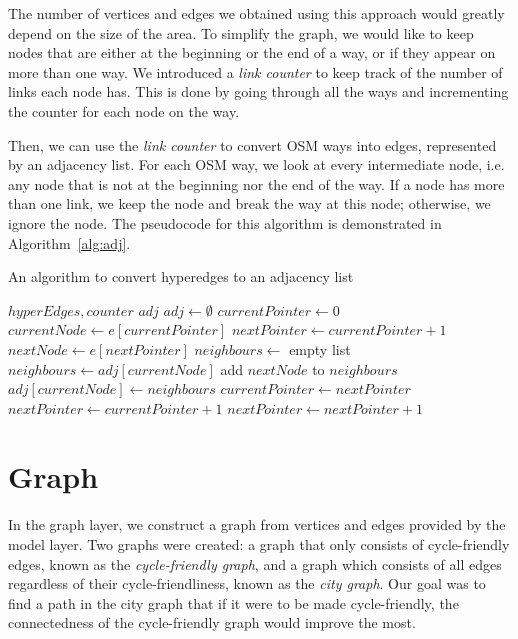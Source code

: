 \documentclass[12pt,a4paper]{report}
\begin{document}
The number of vertices and edges we obtained using this approach would greatly depend on the size of the area. To simplify the graph, we would like to keep nodes that are either at the beginning or the end of a way, or if they appear on more than one way. We introduced a \textit{link counter} to keep track of the number of links each node has. This is done by going through all the ways and incrementing the counter for each node on the way.

Then, we can use the \textit{link counter} to convert OSM ways into edges, represented by an adjacency list. For each OSM way, we look at every intermediate node, i.e. any node that is not at the beginning nor the end of the way. If a node has more than one link, we keep the node and break the way at this node; otherwise, we ignore the node. The pseudocode for this algorithm is demonstrated in Algorithm~\ref{alg:adj}.

\begin{algorithm}
\caption{An algorithm to convert hyperedges to an adjacency list}\label{alg:adj}
\begin{algorithmic}
\Require $hyperEdges, counter$
\Ensure $adj$
\State $adj\gets \emptyset$
    \State $currentPointer\gets 0$
    \State $currentNode\gets e[currentPointer]$
    \State $nextPointer \gets currentPointer + 1$
        \State $nextNode\gets e[nextPointer]$
                \State $neighbours\gets$ empty list
                    \State $neighbours\gets adj[currentNode]$
                \EndIf
                \State add $nextNode$ to $neighbours$
                \State $adj[currentNode]\gets neighbours$
                \State $currentPointer\gets nextPointer$
                \State $nextPointer\gets currentPointer + 1$
            \EndIf
        \Else
            \State $nextPointer\gets nextPointer + 1$
        \EndIf
    \EndWhile
\EndFor
\end{algorithmic}
\end{algorithm}

\section{Graph}\label{sec:graph impl}
In the graph layer, we construct a graph from vertices and edges provided by the model layer. Two graphs were created: a graph that only consists of cycle-friendly edges, known as the \textit{cycle-friendly graph}, and a graph which consists of all edges regardless of their cycle-friendliness, known as the \textit{city graph}. Our goal was to find a path in the city graph that if it were to be made cycle-friendly, the connectedness of the cycle-friendly graph would improve the most.
\end{document}
